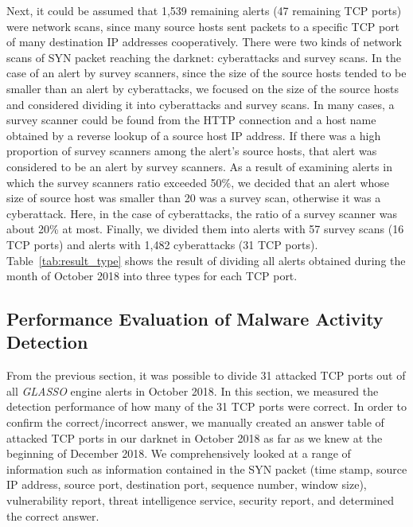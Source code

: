 \documentclass[conference]{IEEEtran}
\begin{document}
Next, it could be assumed that 1,539 remaining alerts (47 remaining TCP ports) were network scans, since many source hosts sent packets to a specific TCP port of many destination IP addresses cooperatively.
There were two kinds of network scans of SYN packet reaching the darknet: cyberattacks and survey scans.
In the case of an alert by survey scanners, since the size of the source hosts tended to be smaller than an alert by cyberattacks, we focused on the size of the source hosts and considered dividing it into cyberattacks and survey scans.
In many cases, a survey scanner could be found from the HTTP connection and a host name obtained by a reverse lookup of a source host IP address.
If there was a high proportion of survey scanners among the alert's source hosts, that alert was considered to be an alert by survey scanners.
As a result of examining alerts in which the survey scanners ratio exceeded 50\%, we decided that an alert whose size of source host was smaller than 20 was a survey scan, otherwise it was a cyberattack.
Here, in the case of cyberattacks, the ratio of a survey scanner was about 20\% at most.
Finally, we divided them into alerts with 57 survey scans (16 TCP ports) and alerts with 1,482 cyberattacks (31 TCP ports).
Table~\ref{tab:result_type} shows the result of dividing all alerts obtained during the month of October 2018 into three types for each TCP port.







\subsection{Performance Evaluation of Malware Activity Detection}
From the previous section, it was possible to divide 31 attacked TCP ports out of all {\it GLASSO} engine alerts in October 2018.
In this section, we measured the detection performance of how many of the 31 TCP ports were correct.
In order to confirm the correct/incorrect answer, we manually created an answer table of attacked TCP ports in our darknet in October 2018 as far as we knew at the beginning of December 2018.
We comprehensively looked at a range of information such as information contained in the SYN packet (time stamp, source IP address, source port, destination port, sequence number, window size), vulnerability report, threat intelligence service, security report, and determined the correct answer.
\end{document}
